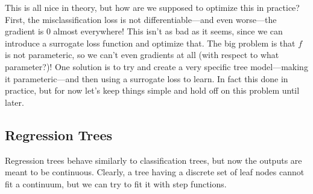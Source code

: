   This is all nice in theory, but how are we supposed to optimize this in practice? First, the misclassification loss is not differentiable---and even worse---the gradient is $0$ almost everywhere! This isn't as bad as it seems, since we can introduce a surrogate loss function and optimize that. The big problem is that $f$ is not parameteric, so we can't even gradients at all (with respect to what parameter?)! One solution is to try and create a very specific tree model---making it parameteric---and then using a surrogate loss to learn. In fact this done in practice, but for now let's keep things simple and hold off on this problem until later. 

\subsection{Regression Trees}

  Regression trees behave similarly to classification trees, but now the outputs are meant to be continuous. Clearly, a tree having a discrete set of leaf nodes cannot fit a continuum, but we can try to fit it with step functions. 

